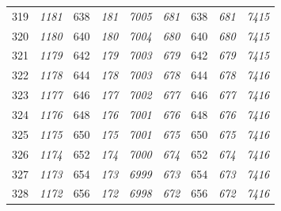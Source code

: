 \documentclass[10pt,fleqn]{article}
\begin{document}
\begin{longtable}{c|cccccccc}
319 & {\color{blue} \it 1181 \rm} & {\color{black} 638} & {\color{blue} \it 181 \rm} & {\color{blue} \it 7005 \rm} & {\color{blue} \it 681 \rm} & {\color{black} 638} & {\color{blue} \it 681 \rm} & {\color{blue} \it 7415 \rm} \\
320 & {\color{blue} \it 1180 \rm} & {\color{black} 640} & {\color{blue} \it 180 \rm} & {\color{blue} \it 7004 \rm} & {\color{blue} \it 680 \rm} & {\color{black} 640} & {\color{blue} \it 680 \rm} & {\color{blue} \it 7415 \rm} \\
321 & {\color{blue} \it 1179 \rm} & {\color{black} 642} & {\color{blue} \it 179 \rm} & {\color{blue} \it 7003 \rm} & {\color{blue} \it 679 \rm} & {\color{black} 642} & {\color{blue} \it 679 \rm} & {\color{blue} \it 7415 \rm} \\
322 & {\color{blue} \it 1178 \rm} & {\color{black} 644} & {\color{blue} \it 178 \rm} & {\color{blue} \it 7003 \rm} & {\color{blue} \it 678 \rm} & {\color{black} 644} & {\color{blue} \it 678 \rm} & {\color{blue} \it 7416 \rm} \\
323 & {\color{blue} \it 1177 \rm} & {\color{black} 646} & {\color{blue} \it 177 \rm} & {\color{blue} \it 7002 \rm} & {\color{blue} \it 677 \rm} & {\color{black} 646} & {\color{blue} \it 677 \rm} & {\color{blue} \it 7416 \rm} \\
324 & {\color{blue} \it 1176 \rm} & {\color{black} 648} & {\color{blue} \it 176 \rm} & {\color{blue} \it 7001 \rm} & {\color{blue} \it 676 \rm} & {\color{black} 648} & {\color{blue} \it 676 \rm} & {\color{blue} \it 7416 \rm} \\
325 & {\color{blue} \it 1175 \rm} & {\color{black} 650} & {\color{blue} \it 175 \rm} & {\color{blue} \it 7001 \rm} & {\color{blue} \it 675 \rm} & {\color{black} 650} & {\color{blue} \it 675 \rm} & {\color{blue} \it 7416 \rm} \\
326 & {\color{blue} \it 1174 \rm} & {\color{black} 652} & {\color{blue} \it 174 \rm} & {\color{blue} \it 7000 \rm} & {\color{blue} \it 674 \rm} & {\color{black} 652} & {\color{blue} \it 674 \rm} & {\color{blue} \it 7416 \rm} \\
327 & {\color{blue} \it 1173 \rm} & {\color{black} 654} & {\color{blue} \it 173 \rm} & {\color{blue} \it 6999 \rm} & {\color{blue} \it 673 \rm} & {\color{black} 654} & {\color{blue} \it 673 \rm} & {\color{blue} \it 7416 \rm} \\
328 & {\color{blue} \it 1172 \rm} & {\color{black} 656} & {\color{blue} \it 172 \rm} & {\color{blue} \it 6998 \rm} & {\color{blue} \it 672 \rm} & {\color{black} 656} & {\color{blue} \it 672 \rm} & {\color{blue} \it 7416 \rm} \\

\end{longtable}
\end{document}
